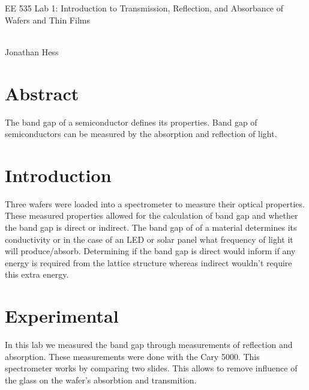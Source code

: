 \documentclass[10pt,a4paper]{article}
\begin{document}
\newenvironment{indentPar}[1]%
 {\begin{list}{}%
         {\setlength{\leftmargin}{#1}}%
         \item[]%
 }
 {\end{list}}

\begin{flushleft}
\begin{LARGE}EE 535 Lab 1: Introduction to Transmission, Reflection, and Absorbance of Wafers and Thin Films
\end{LARGE}
\\Jonathan Hess
\end{flushleft}


\section*{Abstract}
\begin{indentPar}{1cm}
The band gap of a semiconductor defines its properties. Band gap of semiconductors can be measured by the absorption and reflection of light.
\end{indentPar}


\section*{Introduction}
\begin{indentPar}{1cm}
Three wafers were loaded into a spectrometer to measure their optical properties. These measured properties allowed for the calculation of band gap and whether the band gap is direct or indirect. The band gap of of a material determines its conductivity or in the case of an LED or solar panel what frequency of light it will produce/absorb. Determining if the band gap is direct would inform if any energy is required from the lattice structure whereas indirect wouldn't require this extra energy.
\end{indentPar}



\section*{Experimental}
\begin{indentPar}{1cm}
In this lab we measured the band gap through measurements of reflection and absorption. These measurements were done with the Cary 5000. This spectrometer works by comparing two slides. This allows to remove influence of the glass on the wafer's absorbtion and transmition.
\end{indentPar}
\end{document}
